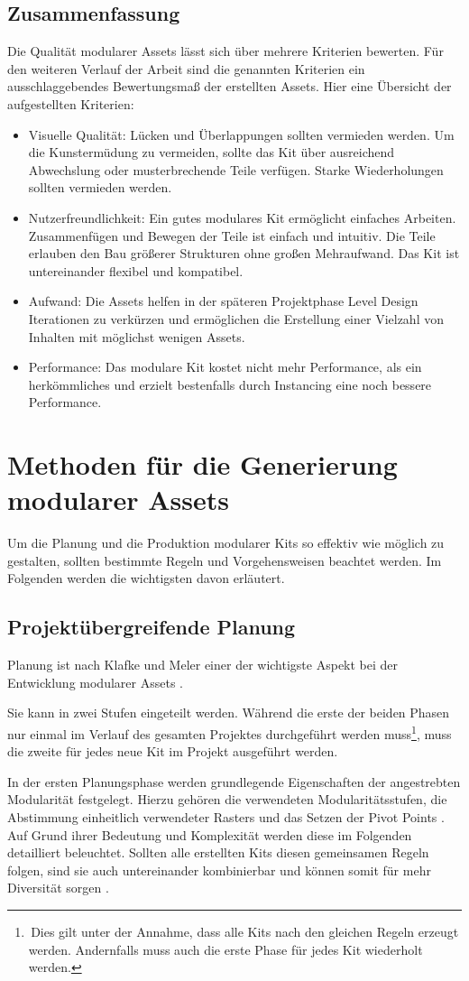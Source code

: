 \subsection{Zusammenfassung}
Die Qualität modularer Assets lässt sich über mehrere Kriterien bewerten. Für den weiteren Verlauf der Arbeit sind die genannten Kriterien ein ausschlaggebendes Bewertungsmaß der erstellten Assets. Hier eine Übersicht der aufgestellten Kriterien:
\begin{itemize}
\item Visuelle Qualität: Lücken und Überlappungen sollten vermieden werden. Um die Kunstermüdung zu vermeiden, sollte das Kit über ausreichend Abwechslung oder musterbrechende Teile verfügen. Starke Wiederholungen sollten vermieden werden.
\item Nutzerfreundlichkeit: Ein gutes modulares Kit ermöglicht einfaches Arbeiten. Zusammenfügen und Bewegen der Teile ist einfach und intuitiv. Die Teile erlauben den Bau größerer Strukturen ohne großen Mehraufwand. Das Kit ist untereinander flexibel und kompatibel.
\item Aufwand: Die Assets helfen in der späteren Projektphase Level Design Iterationen zu verkürzen und ermöglichen die Erstellung einer Vielzahl von Inhalten mit möglichst wenigen Assets.
\item Performance: Das modulare Kit kostet nicht mehr Performance, als ein herkömmliches und erzielt bestenfalls durch Instancing eine noch bessere Performance.
\end{itemize}
\newpage
\section{Methoden für die Generierung modularer Assets}
Um die Planung und die Produktion modularer Kits so effektiv wie möglich zu gestalten, sollten bestimmte Regeln und Vorgehensweisen beachtet werden. Im Folgenden werden die wichtigsten davon erläutert.
\subsection{Projektübergreifende Planung}
Planung ist nach Klafke und Meler einer der wichtigste Aspekt bei der Entwicklung modularer Assets \parencite{Klafke,Meler}.
\par
Sie kann in zwei Stufen eingeteilt werden. Während die erste der beiden Phasen nur einmal im Verlauf des gesamten Projektes durchgeführt werden muss\footnote{\,Dies gilt unter der Annahme, dass alle Kits nach den gleichen Regeln erzeugt werden. Andernfalls muss auch die erste Phase für jedes Kit wiederholt werden.}, muss die zweite für jedes neue Kit im Projekt ausgeführt werden. \parencite{Burgess}
\par
In der ersten Planungsphase werden grundlegende Eigenschaften der angestrebten Modularität festgelegt. Hierzu gehören die verwendeten Modularitätsstufen, die Abstimmung einheitlich verwendeter Rasters \parencite{Perry} und das Setzen der Pivot Points \parencite{Mader}. Auf Grund ihrer Bedeutung und Komplexität werden diese im Folgenden detailliert beleuchtet. Sollten alle erstellten Kits diesen gemeinsamen Regeln folgen, sind sie auch untereinander kombinierbar und können somit für mehr Diversität sorgen \parencite{Burgess}.
